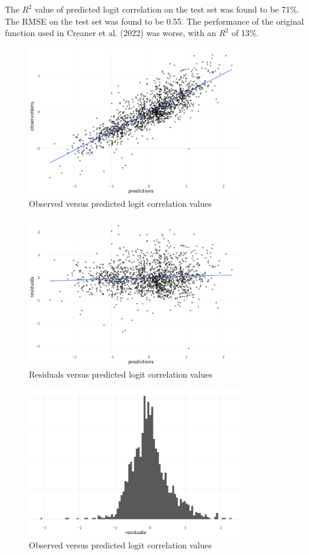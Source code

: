 \documentclass[]{elsarticle} %
\begin{document}
The \(R^2\) value of predicted logit correlation on the test set was
found to be 71\%. The RMSE on the test set was found to be 0.55. The
performance of the original function used in Creaner et al. (2022) was
worse, with an \(R^2\) of 13\%.

\begin{figure}
  \includegraphics[width=\columnwidth, height = 6.5cm]{figures/observed-predicted}
    \caption{Observed versus predicted logit correlation values}
    \label{fig:obs-pred}
\end{figure}

\begin{figure}
  \includegraphics[width=\columnwidth, height = 6.5cm]{figures/residuals-predicted}
    \caption{Residuals versus predicted logit correlation values}
    \label{fig:residuals-pred}
\end{figure}

\begin{figure}
  \includegraphics[width=\columnwidth, height = 6.5cm]{figures/residuals-hist}
    \caption{Observed versus predicted logit correlation values}
    \label{fig:residuals-hist}
\end{figure}
\end{document}
